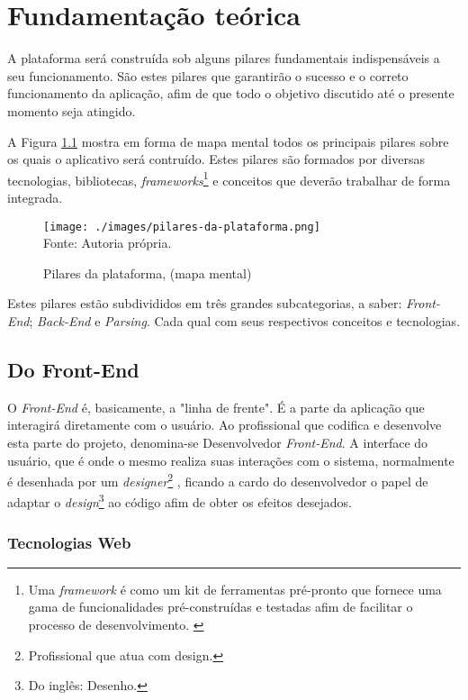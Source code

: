 \chapter{Fundamentação teórica}

A plataforma será construída sob alguns pilares fundamentais indispensáveis
a seu funcionamento. São estes pilares que garantirão o sucesso e o correto
funcionamento da aplicação, afim de que todo o objetivo discutido até o
presente momento seja atingido.

A
Figura \ref{fig:pilares-da-plataforma}
mostra em forma de mapa mental todos os principais pilares sobre os quais
o aplicativo será contruído. Estes pilares são formados por diversas
tecnologias, bibliotecas,
\textit{frameworks}\footnote{Uma \textit{framework} é como um kit de ferramentas pré-pronto que fornece uma gama
    de funcionalidades pré-construídas e testadas afim de facilitar o processo
    de desenvolvimento. \cite{amazon-framework}
}
e conceitos que deverão trabalhar de forma integrada.

\begin{figure}[H]
    \centering
    \caption{Pilares da plataforma, (mapa mental)}
    \texttt{[image: ./images/pilares-da-plataforma.png]}
    \label{fig:pilares-da-plataforma} \\
    \textnormal{\fontsize{10pt}{12pt}Fonte: Autoria própria.}
\end{figure}

Estes pilares estão subdivididos em três grandes subcategorias, a saber: \textit{Front-End};
\textit{Back-End} e \textit{Parsing}. Cada qual com seus respectivos conceitos e tecnologias.

\section{Do Front-End}

O
\textit{Front-End}
é, basicamente, a "linha de frente". É a parte da aplicação que interagirá
diretamente com o usuário. Ao profissional que codifica e desenvolve esta parte do
projeto, denomina-se Desenvolvedor \textit{Front-End}. A interface do usuário, que é
onde o mesmo realiza suas interações com o sistema, normalmente é desenhada por
um
\textit{designer}\footnote{Profissional que atua com design.
}
, ficando a cardo do desenvolvedor o papel de adaptar o
\textit{design}\footnote{Do inglês: Desenho.
}
ao código afim de obter os efeitos desejados.
\cite{totvs-front-end}

\subsection{Tecnologias Web}

